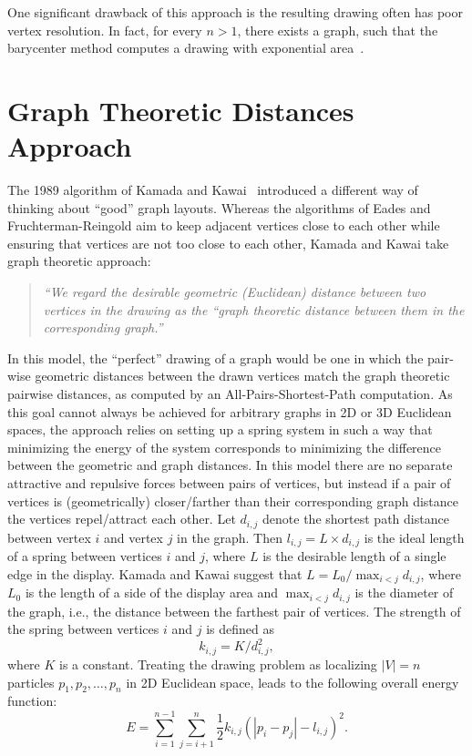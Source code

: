 \documentclass[notitlepage,letter,11pt]{article}
\begin{document}
One significant drawback of this approach is the resulting drawing
often has poor vertex resolution. In fact, for every $n>1$, there
exists a graph, such that the barycenter method computes a drawing
with exponential area~\cite{conf/gd/EadesG95}.

\section{Graph Theoretic Distances Approach}
\label{fd:sec:kk}

The 1989 algorithm of Kamada and Kawai~\cite{kk-adgug-89} introduced a
different way of thinking about ``good'' graph layouts. Whereas the
algorithms of Eades and Fruchterman-Reingold aim to keep adjacent
vertices close to each other while ensuring that vertices are not too
close to each other, Kamada and Kawai take graph theoretic approach:

\begin{quote}
{\em ``We regard the desirable geometric (Euclidean) distance between
two vertices in the drawing as the ``graph theoretic distance between
them in the corresponding graph.''}
\end{quote}

In this model, the ``perfect'' drawing of a graph would be one in
which the pair-wise geometric distances between the drawn vertices
match the graph theoretic pairwise distances, as computed by an
All-Pairs-Shortest-Path computation. As this goal cannot always be
achieved for arbitrary graphs in 2D or 3D Euclidean spaces, the
approach relies on setting up a spring system in such a way that
minimizing the energy of the system corresponds to minimizing the
difference between the geometric and graph distances. In this model
there are no separate attractive and repulsive forces between pairs of
vertices, but instead if a pair of vertices is (geometrically)
closer/farther than their corresponding graph distance the vertices
repel/attract each other. Let $d_{i,j}$ denote the shortest path
distance between vertex $i$ and vertex $j$ in the graph. Then
$l_{i,j}=L\times d_{i,j}$ is the ideal length of a spring between
vertices $i$ and $j$, where $L$ is the desirable length of a single
edge in the display. Kamada and Kawai suggest that $L=L_0/\max_{i<j}
d_{i,j}$, where $L_0$ is the length of a side of the display area and
$\max_{i<j} d_{i,j}$ is the diameter of the graph, i.e., the distance
between the farthest pair of vertices. The strength of the spring
between vertices $i$ and $j$ is defined as $$k_{i,j}=K/d_{i,j}^2,$$
where $K$ is a constant. Treating the drawing problem as
localizing $|V|=n$ particles $p_1, p_2,\dots, p_n$ in 2D Euclidean
space, leads to the following overall energy function:
$$E=\sum_{i=1}^{n-1}\sum_{j=i+1}^{n}\frac{1}{2}k_{i,j}(|p_i-p_j|-l_{i,j})^2.$$
\end{document}
